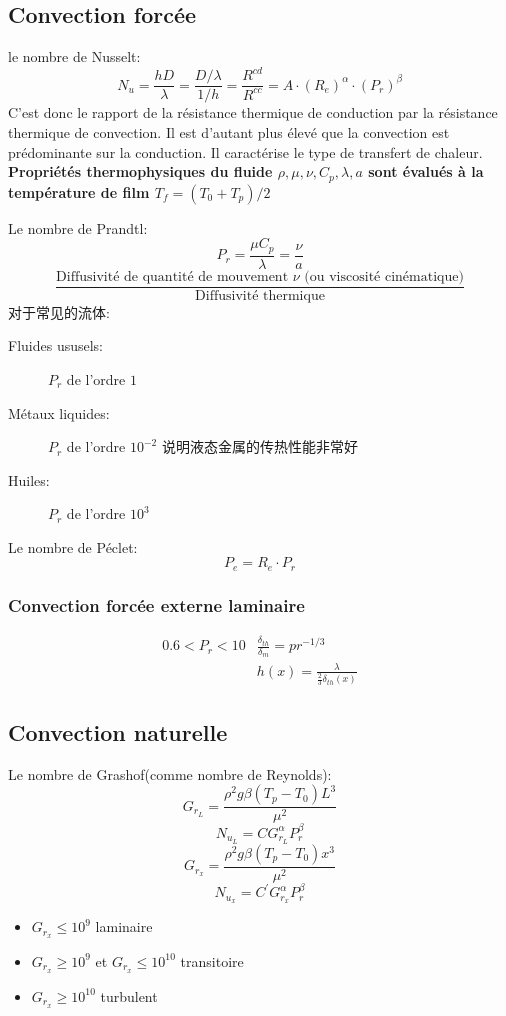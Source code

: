 \documentclass{article}
\begin{document}
\subsection{Convection forc\'ee}
le nombre de Nusselt:$$N_u = \frac{hD}{\lambda }=\frac{D/\lambda }{1/h}=\frac{R^{cd}}{R^{cc}}=A\cdot (R_e)^{\alpha}\cdot (P_r)^{\beta}$$
C'est donc le rapport de la r\'esistance thermique de conduction par la r\'esistance thermique de convection. Il est d'autant plus \'elev\'e que la convection est pr\'edominante sur la conduction. Il caract\'erise le type de transfert
de chaleur.\\
\textbf{Propri\'et\'es thermophysiques du fluide $\rho, \mu, \nu, C_p, \lambda, a$ sont \'evalu\'es \`a la temp\'erature de film $T_f = (T_0 + T_p)/2$}

Le nombre de Prandtl:
$$
P_r = \frac{ \mu C_p}{\lambda }=\frac{ \nu}{a}
$$
$$
\frac{\text{Diffusivit\'e de quantit\'e de mouvement $\nu$ (ou viscosit\'e cin\'ematique)}}{\text{Diffusivit\'e thermique}}
$$
对于常见的流体:
\begin{description}
\item [Fluides ususels:] $P_r$ de l'ordre $1$
\item [M\'etaux liquides:] $P_r$ de l'ordre $10^{-2}$ 说明液态金属的传热性能非常好
\item [Huiles:] $P_r$ de l'ordre $10^3$
\end{description}

Le nombre de P\'eclet:$$P_e = R_e \cdot P_r$$

\subsubsection{Convection forc\'ee externe laminaire}
\begin{eqnarray}
 0.6<P_r<10 & \frac{ \delta _{th}}{\delta _m}=pr^{-1/3} \\
 & h(x)=\frac{ \lambda }{\frac{ 2}{3}\delta _{th}(x)}
\end{eqnarray}

\subsection{Convection naturelle}
Le nombre de Grashof(comme nombre de Reynolds):
$$G_{r_L} = \frac{ \rho^2 g \beta (T_p - T_0)L^3}{\mu ^2}$$
$$N_{u_L} = C G_{r_L}^{\alpha}P_r^{\beta}$$
$$G_{r_x} = \frac{ \rho^2 g \beta (T_p - T_0)x^3}{\mu ^2}$$
$$N_{u_x} = C^{\prime} G_{r_x}^{\alpha}P_r^{\beta}$$

\begin{itemize}
\item $G_{r_x}\leq 10^9$ laminaire
\item $G_{r_x}\geq 10^9$ et $G_{r_x} \leq 10^{10}$ transitoire
\item $G_{r_x}\geq 10^{10}$ turbulent
\end{itemize}
\end{document}
